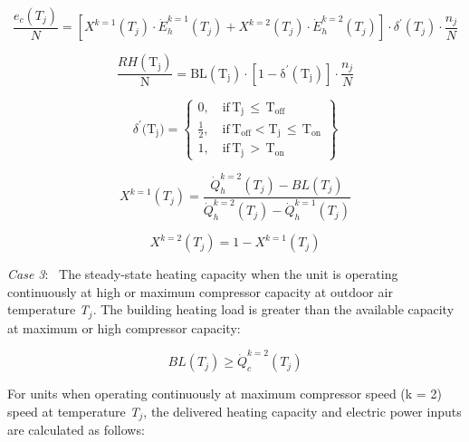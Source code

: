 \begin{equation}
\frac{{{e_c}({T_j})}}{N} = \left[ {{X^{k = 1}}({T_j}) \cdot \dot E_h^{k = 1}({T_j}) + {X^{k = 2}}({T_j}) \cdot \dot E_h^{k = 2}({T_j})} \right] \cdot {\delta ^\prime}({T_j}) \cdot \frac{{{n_j}}}{N}
\end{equation}

\begin{equation}
\frac{{RH\left( {{{\mathrm{T}}_{\mathrm{j}}}} \right)}}{{\mathrm{N}}}{\mathrm{ = BL}}\left( {{{\mathrm{T}}_{\mathrm{j}}}} \right) \cdot \left[ {{\mathrm{1 - }}{{\mathrm{\delta }}^\prime}\left( {{{\mathrm{T}}_{\mathrm{j}}}} \right)} \right] \cdot \frac{{{n_j}}}{N}
\end{equation}

\begin{equation}
{\delta ^\prime}{\mathrm{(}}{{\mathrm{T}}_{\mathrm{j}}}{\mathrm{) = }}\left\{ \begin{array}{l}0,\quad {\mathrm{if}}\,{{\mathrm{T}}_{\mathrm{j}}}\, \le \,{{\mathrm{T}}_{{\mathrm{off}}}}\,\\ {\frac{1}{2}},\quad {\mathrm{if}}\,{{\mathrm{T}}_{{\mathrm{off}}}} < {{\mathrm{T}}_{\mathrm{j}}}\, \le \,{{\mathrm{T}}_{{\mathrm{on}}}}\\ 1,\quad {\mathrm{if}}\,{{\mathrm{T}}_{\mathrm{j}}}\, > \,{{\mathrm{T}}_{{\mathrm{on}}}}\end{array} \right\}
\end{equation}

\begin{equation}
{X^{k = 1}}({T_j}) = \frac{{\dot Q_h^{k = 2}({T_j}) - BL({T_j})}}{{\dot Q_h^{k = 2}({T_j}) - \dot Q_h^{k = 1}({T_j})}}
\end{equation}

\begin{equation}
{X^{k = 2}}({T_j}) = 1 - {X^{k = 1}}({T_j})
\end{equation}

\emph{Case 3}:~ The steady-state heating capacity when the unit is operating continuously at high or maximum compressor capacity at outdoor air temperature \emph{T\(_{j}\)}. The building heating load is greater than the available capacity at maximum or high compressor capacity:

\begin{equation}
BL\left( {{T_j}} \right) \ge \dot Q_c^{k = 2}\left( {{T_j}} \right)
\end{equation}

For units when operating continuously at maximum compressor speed (k = 2) speed at temperature \emph{T\(_{j}\)}, the delivered heating capacity and electric power inputs are calculated as follows:

